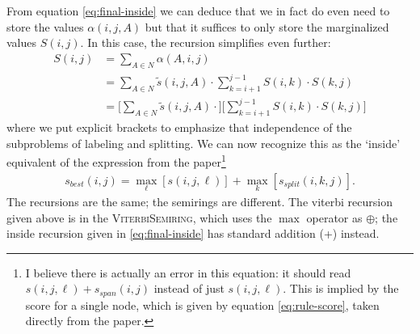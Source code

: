 From equation \ref{eq:final-inside} we can deduce that we in fact do even need to store the values $\alpha(i, j, A)$ but that it suffices to only store the marginalized values $S(i, j)$. In this case, the recursion simplifies even further:
\begin{subequations}
\begin{align*}
    S(i, j) &= \sum_{A \in N} \alpha(A,i,j) \\
        &=  \sum_{A \in N} \tilde{s}(i, j, A) \cdot \sum_{k=i+1}^{j-1} S(i,k) \cdot S(k,j) \\
        &= \Bigg[ \sum_{A \in N} \tilde{s}(i, j, A) \cdot \Bigg] \Bigg[\sum_{k=i+1}^{j-1} S(i,k) \cdot  S(k,j) \Bigg]
\end{align*}
\end{subequations}
where we put explicit brackets to emphasize that independence of the subproblems of labeling and splitting. We can now recognize this as the `inside' equivalent of the expression from the paper\footnote{I believe there is actually an error in this equation: it should read  $s(i, j, \ell) + s_{span}(i, j)$ instead of just $s(i, j, \ell)$. This is implied by the score for a single node, which is given by equation \ref{eq:rule-score}, taken directly from the paper.}
\begin{align}
    s_{best}(i, j) = \max_{\ell} [s(i, j, \ell)] + \max_{k}[ s_{split}(i, k, j)].
\end{align}
The recursions are the same; the semirings are different. The viterbi recursion given above is in the \textsc{ViterbiSemiring}, which uses the $\max$ operator as $\oplus$; the inside recursion given in \ref{eq:final-inside} has standard addition (+) instead.


